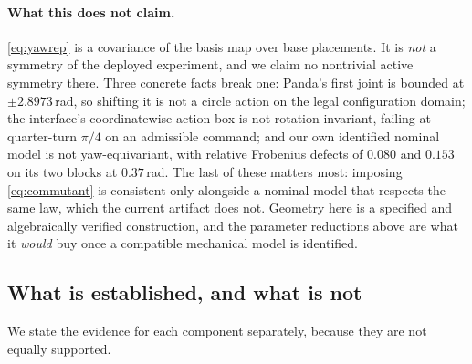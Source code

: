 \paragraph{What this does not claim.} \eqref{eq:yawrep} is a covariance of the
basis map over base placements. It is \emph{not} a symmetry of the deployed
experiment, and we claim no nontrivial active symmetry there. Three concrete
facts break one: Panda's first joint is bounded at $\pm2.8973$\,rad, so shifting
it is not a circle action on the legal configuration domain; the interface's
coordinatewise action box is not rotation invariant, failing at quarter-turn
$\pi/4$ on an admissible command; and our own identified nominal model is not
yaw-equivariant, with relative Frobenius defects of $0.080$ and $0.153$ on its
two blocks at $0.37$\,rad. The last of these matters most: imposing
\eqref{eq:commutant} is consistent only alongside a nominal model that respects
the same law, which the current artifact does not. Geometry here is a specified
and algebraically verified construction, and the parameter reductions above are
what it \emph{would} buy once a compatible mechanical model is identified.

\subsection{What is established, and what is not}\label{sec:method:status}

We state the evidence for each component separately, because they are not equally
supported.

